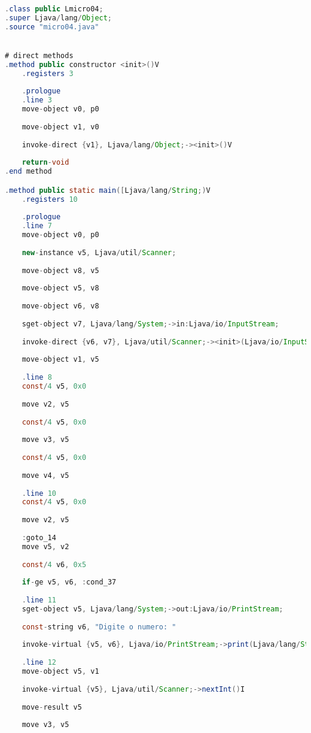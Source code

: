 \documentclass[hidelinks,12pt]{article}
\begin{document}
	\begin{lstlisting}[caption=Smali resultante do .java,language=java]
.class public Lmicro04;
.super Ljava/lang/Object;
.source "micro04.java"


# direct methods
.method public constructor <init>()V
	.registers 3
	
	.prologue
	.line 3
	move-object v0, p0
	
	move-object v1, v0
	
	invoke-direct {v1}, Ljava/lang/Object;-><init>()V
	
	return-void
.end method

.method public static main([Ljava/lang/String;)V
	.registers 10
	
	.prologue
	.line 7
	move-object v0, p0
	
	new-instance v5, Ljava/util/Scanner;
	
	move-object v8, v5
	
	move-object v5, v8
	
	move-object v6, v8
	
	sget-object v7, Ljava/lang/System;->in:Ljava/io/InputStream;
	
	invoke-direct {v6, v7}, Ljava/util/Scanner;-><init>(Ljava/io/InputStream;)V
	
	move-object v1, v5
	
	.line 8
	const/4 v5, 0x0
	
	move v2, v5
	
	const/4 v5, 0x0
	
	move v3, v5
	
	const/4 v5, 0x0
	
	move v4, v5
	
	.line 10
	const/4 v5, 0x0
	
	move v2, v5
	
	:goto_14
	move v5, v2
	
	const/4 v6, 0x5
	
	if-ge v5, v6, :cond_37
	
	.line 11
	sget-object v5, Ljava/lang/System;->out:Ljava/io/PrintStream;
	
	const-string v6, "Digite o numero: "
	
	invoke-virtual {v5, v6}, Ljava/io/PrintStream;->print(Ljava/lang/String;)V
	
	.line 12
	move-object v5, v1
	
	invoke-virtual {v5}, Ljava/util/Scanner;->nextInt()I
	
	move-result v5
	
	move v3, v5
	

\end{lstlisting}
\end{document}
